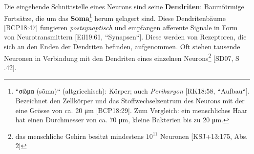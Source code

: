 Die eingehende Schnittstelle eines Neurons sind seine \textbf{Dendriten}: Baumförmige Fortsätze, die um das \textbf{Soma}\footnote{
  ``\textgreek{σῶμα} (sõma)`` (altgriechisch): Körper; auch \textit{Perikaryon} [RK18:58, ``Aufbau``]. Bezeichnet den Zellkörper und das Stoffwechselzentrum des Neurons mit der eine Grösse von ca. 20 μm [BCP18:29]. Zum Vergleich: ein menschliches Haar hat einen Durchmesser von ca. 70 μm, kleine Bakterien bis zu 20 μm.
} herum gelagert sind.
Diese Dendritenbäume [BCP18:47] fungieren \textit{postsynaptisch} und empfangen afferente Signale in Form von Neurotransmittern [Eil19:61, ``Synapsen``].
Diese werden von Rezeptoren, die sich an den Enden der Dendriten befinden, aufgenommen.
Oft stehen tausende Neuronen in Verbindung mit den Dendriten eines einzelnen Neurons\footnote{
 das menschliche Gehirn besitzt mindestens $10^{11}$ Neuronen [KSJ+13:175, Abs. 2]
} [SD07, S .42].\\


